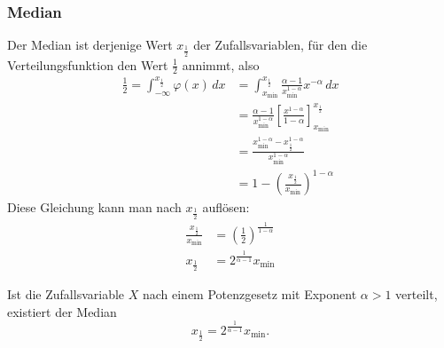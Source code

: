 \subsubsection{Median} \label{subsubsection-median}
Der Median ist derjenige Wert $x_{\frac12}$ der Zufallsvariablen,
für den die Verteilungsfunktion den Wert $\frac12$ annimmt, also
\begin{align*}
\frac12=\int_{-\infty}^{x_{\frac12}}\varphi(x)\,dx
&=
\int_{x_{\min}}^{x_{\frac12}}
\frac{\alpha-1}{x_{\min}^{1-\alpha}}
x^{-\alpha}\,dx
\\
&=
\frac{\alpha-1}{x_{\min}^{1-\alpha}}\left[
\frac{x^{1-\alpha}}{1-\alpha}
\right]_{x_{\min}}^{x_{\frac12}}
\\
&=
\frac{x_{\min}^{1-\alpha}-x_{\frac12}^{1-\alpha}}{x_{\min}^{1-\alpha}}
\\
&=
1-\left(
\frac{x_{\frac12}}{x_{\min}}
\right)^{1-\alpha}
\end{align*}
Diese Gleichung kann man nach $x_{\frac12}$ auflösen:
\begin{align*}
\frac{x_{\frac12}}{x_{\min}}
&=
\left(\frac12\right)^{\frac1{1-\alpha}}
\\
x_{\frac12}&=2^{\frac1{\alpha-1}}x_{\min}
\end{align*}
\begin{satz}
Ist die Zufallsvariable $X$ nach einem Potenzgesetz mit Exponent $\alpha>1$
verteilt, existiert der Median
\[
x_{\frac12}=2^{\frac1{\alpha-1}}x_{\min}.
\]
\end{satz}
